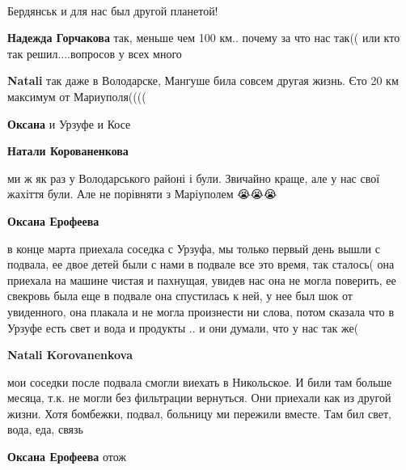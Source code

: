  
 
 
 
 

\qqSecCmt

🙏🙏💔


Бердянськ и для нас был другой планетой!

\begin{itemize} %
\textbf{Надежда Горчакова} так, меньше чем 100 км.. почему за что нас так(( или кто так решил....вопросов у всех много

\textbf{Natali} так даже в Володарске, Мангуше била совсем другая жизнь. Єто 20 км максимум от Мариуполя((((

\textbf{Оксана} и Урзуфе и Косе

\textbf{Натали Корованенкова} 

ми ж як раз у Володарського районі і були. Звичайно краще, але у нас свої
жахіття були. Але не порівняти з Маріуполем 😭😭😭

\textbf{Оксана Ерофеева} 

в конце марта приехала соседка с Урзуфа, мы только первый день вышли с подвала,
ее двое детей были с нами в подвале все это время, так сталось( она приехала на
машине чистая и пахнущая, увидев нас она не могла поверить, ее свекровь была
еще в подвале она спустилась к ней, у нее был шок от увиденного, она плакала и
не могла произнести ни слова, потом сказала что в Урзуфе есть свет и вода и
продукты .. и они думали, что у нас так же(


\textbf{Natali Korovanenkova} 

мои соседки после подвала смогли виехать в Никольское. И били там больше
месяца, т.к. не могли без фильтрации вернуться. Они приехали как из другой
жизни. Хотя бомбежки, подвал, больницу ми пережили вместе. Там бил свет, вода,
еда, связь

\textbf{Оксана Ерофеева} отож

\end{itemize} %

